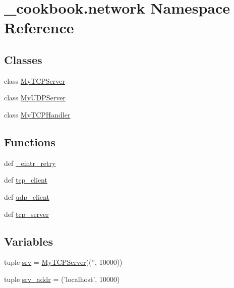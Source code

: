 \hypertarget{namespace__cookbook_1_1network}{\section{\-\_\-cookbook.\-network Namespace Reference}
\label{namespace__cookbook_1_1network}
}
\subsection*{Classes}
\begin{DoxyCompactItemize}
\item 
class \hyperlink{class__cookbook_1_1network_1_1MyTCPServer}{My\-T\-C\-P\-Server}
\item 
class \hyperlink{class__cookbook_1_1network_1_1MyUDPServer}{My\-U\-D\-P\-Server}
\item 
class \hyperlink{class__cookbook_1_1network_1_1MyTCPHandler}{My\-T\-C\-P\-Handler}
\end{DoxyCompactItemize}
\subsection*{Functions}
\begin{DoxyCompactItemize}
\item 
def \hyperlink{namespace__cookbook_1_1network_a3d1bb77e5f5c2b7ad21cb41f8e76ff2b}{\-\_\-eintr\-\_\-retry}
\item 
def \hyperlink{namespace__cookbook_1_1network_afda73ac0991cd562372fb04f9d76e25d}{tcp\-\_\-client}
\item 
def \hyperlink{namespace__cookbook_1_1network_ad136212440d95bb9b1fdaac0cca36668}{udp\-\_\-client}
\item 
def \hyperlink{namespace__cookbook_1_1network_ae7f29425dec008925037e722e4a0e561}{tcp\-\_\-server}
\end{DoxyCompactItemize}
\subsection*{Variables}
\begin{DoxyCompactItemize}
\item 
tuple \hyperlink{namespace__cookbook_1_1network_af47f70f9a1bf283ae86e02e67cf9c91a}{srv} = \hyperlink{class__cookbook_1_1network_1_1MyTCPServer}{My\-T\-C\-P\-Server}(('', 10000))
\item 
tuple \hyperlink{namespace__cookbook_1_1network_a07395291bd1e407e4fdf8850535b5427}{srv\-\_\-addr} = ('localhost', 10000)
\end{DoxyCompactItemize}


